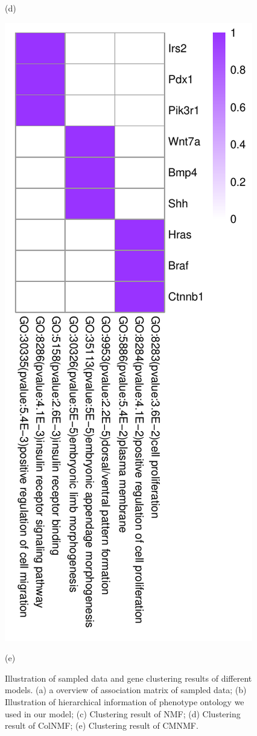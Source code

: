 \documentclass{bmcart}
\begin{document}
\begin{figure}[!h]
\begin{minipage}{.3\linewidth}
    \centerline{(d)}
  \end{minipage}
  \hfil
  \begin{minipage}{.3\linewidth}
   \includegraphics[width=\linewidth]{DrawPictures/v24.pdf}
    \centerline{(e)}
  \end{minipage}
  \caption{Illustration of sampled data and gene clustering results of different models. (a) a overview of
  association matrix of sampled data; (b) Illustration of hierarchical information
  of phenotype ontology we used in our model; (c) Clustering result of NMF; (d)
  Clustering result of ColNMF; (e) Clustering result of CMNMF.}
  \label{fig:sampled_result}
\end{figure}
\end{document}
